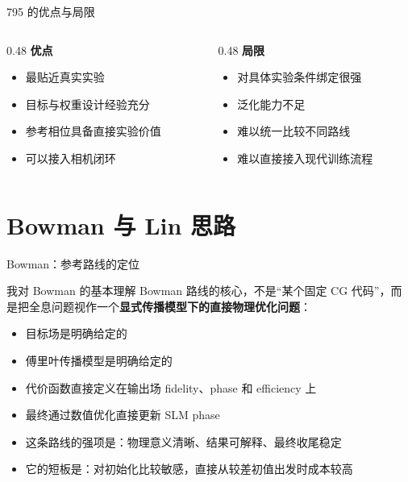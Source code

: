 \documentclass[aspectratio=169,10pt]{ctexbeamer}
\begin{document}
\begin{frame}{795 的优点与局限}
  \begin{columns}[T]
    \begin{column}{0.48\textwidth}
      \textbf{优点}
      \begin{itemize}
        \item 最贴近真实实验
        \item 目标与权重设计经验充分
        \item 参考相位具备直接实验价值
        \item 可以接入相机闭环
      \end{itemize}
    \end{column}
    \begin{column}{0.48\textwidth}
      \textbf{局限}
      \begin{itemize}
        \item 对具体实验条件绑定很强
        \item 泛化能力不足
        \item 难以统一比较不同路线
        \item 难以直接接入现代训练流程
      \end{itemize}
    \end{column}
  \end{columns}
\end{frame}

\section{Bowman 与 Lin 思路}

\begin{frame}{Bowman：参考路线的定位}
  \begin{block}{我对 Bowman 的基本理解}
    Bowman 路线的核心，不是“某个固定 CG 代码”，而是把全息问题视作一个\textbf{显式传播模型下的直接物理优化问题}：
    \begin{itemize}
      \item 目标场是明确给定的
      \item 傅里叶传播模型是明确给定的
      \item 代价函数直接定义在输出场 fidelity、phase 和 efficiency 上
      \item 最终通过数值优化直接更新 SLM phase
    \end{itemize}
  \end{block}

  \vspace{0.4em}
  \begin{itemize}
    \item 这条路线的强项是：物理意义清晰、结果可解释、最终收尾稳定
    \item 它的短板是：对初始化比较敏感，直接从较差初值出发时成本较高
  \end{itemize}
\end{frame}
\end{document}
